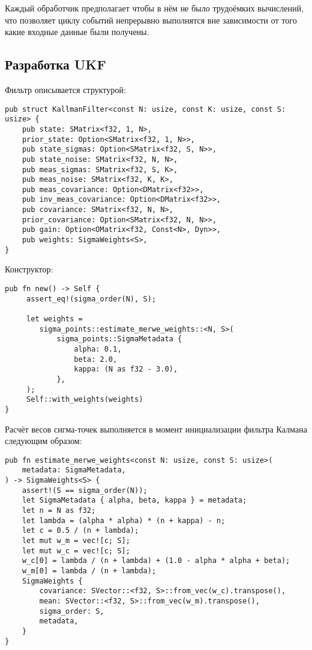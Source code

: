 Каждый обработчик предполагает чтобы в нём не было трудоёмких вычислений, что
позволяет циклу событий непрерывно выполнятся вне зависимости от того какие
входные данные были получены.


\subsection{Разработка UKF}
Фильтр описывается структурой:
\begin{lstlisting}
pub struct KallmanFilter<const N: usize, const K: usize, const S: usize> {
    pub state: SMatrix<f32, 1, N>,
    prior_state: Option<SMatrix<f32, 1, N>>,
    pub state_sigmas: Option<SMatrix<f32, S, N>>,
    pub state_noise: SMatrix<f32, N, N>,
    pub meas_sigmas: SMatrix<f32, S, K>,
    pub meas_noise: SMatrix<f32, K, K>,
    pub meas_covariance: Option<DMatrix<f32>>,
    pub inv_meas_covariance: Option<DMatrix<f32>>,
    pub covariance: SMatrix<f32, N, N>,
    prior_covariance: Option<SMatrix<f32, N, N>>,
    pub gain: Option<OMatrix<f32, Const<N>, Dyn>>,
    pub weights: SigmaWeights<S>,
}
\end{lstlisting}


Конструктор:
\begin{lstlisting}
pub fn new() -> Self {
     assert_eq!(sigma_order(N), S);

     let weights =
        sigma_points::estimate_merwe_weights::<N, S>(
            sigma_points::SigmaMetadata {
                alpha: 0.1,
                beta: 2.0,
                kappa: (N as f32 - 3.0),
            },
     );
     Self::with_weights(weights)
}

\end{lstlisting}

Расчёт весов сигма-точек выполняется в момент инициализации фильтра Калмана
следующим образом:
\begin{lstlisting}
pub fn estimate_merwe_weights<const N: usize, const S: usize>(
    metadata: SigmaMetadata,
) -> SigmaWeights<S> {
    assert!(S == sigma_order(N));
    let SigmaMetadata { alpha, beta, kappa } = metadata;
    let n = N as f32;
    let lambda = (alpha * alpha) * (n + kappa) - n;
    let c = 0.5 / (n + lambda);
    let mut w_m = vec![c; S];
    let mut w_c = vec![c; S];
    w_c[0] = lambda / (n + lambda) + (1.0 - alpha * alpha + beta);
    w_m[0] = lambda / (n + lambda);
    SigmaWeights {
        covariance: SVector::<f32, S>::from_vec(w_c).transpose(),
        mean: SVector::<f32, S>::from_vec(w_m).transpose(),
        sigma_order: S,
        metadata,
    }
}

\end{lstlisting}

